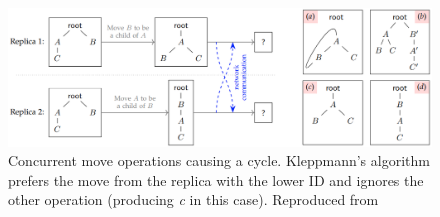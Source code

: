 \documentclass[12pt]{report}
\begin{document}
\begin{itemize}
          \begin{figure}
            \centering
            \includegraphics[width=1\textwidth]{kleppmann.png}
            \caption{Concurrent move operations causing a cycle. Kleppmann's algorithm prefers the move from the replica with the lower ID and ignores the other operation (producing \textit{c} in this case). Reproduced from \cite{9563274}}
            \label{fig:kleppmann}
        \end{figure}
          


\end{itemize}
\end{document}
